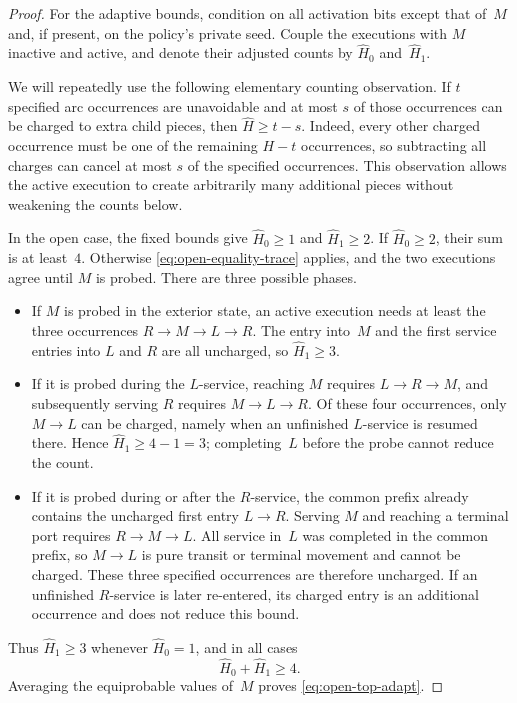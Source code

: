 \documentclass[12pt,a4paper,oneside]{report}
\begin{document}
\begin{proof}
For the adaptive bounds, condition on all activation bits except that of~$M$
and, if present, on the policy's private seed.  Couple the executions with
$M$ inactive and active, and denote their adjusted counts by
$\widehat H_0$ and~$\widehat H_1$.

We will repeatedly use the following elementary counting observation.  If
$t$ specified arc occurrences are unavoidable and at most $s$ of those
occurrences can be charged to extra child pieces, then
$\widehat H\ge t-s$.  Indeed, every other charged occurrence must be one of
the remaining $H-t$ occurrences, so subtracting all charges can cancel at
most $s$ of the specified occurrences.  This observation allows the active
execution to create arbitrarily many additional pieces without weakening the
counts below.

In the open case, the fixed bounds give $\widehat H_0\ge1$ and
$\widehat H_1\ge2$.  If $\widehat H_0\ge2$, their sum is at least~$4$.
Otherwise \cref{eq:open-equality-trace} applies, and the two executions agree
until $M$ is probed.  There are three possible phases.
\begin{itemize}
    \item If $M$ is probed in the exterior state, an active execution needs at
    least the three occurrences $R\to M\to L\to R$.  The entry into~$M$ and
    the first service entries into $L$ and $R$ are all uncharged, so
    $\widehat H_1\ge3$.
    \item If it is probed during the $L$-service, reaching $M$ requires
    $L\to R\to M$, and subsequently serving $R$ requires
    $M\to L\to R$.  Of these four occurrences, only $M\to L$ can be charged,
    namely when an unfinished $L$-service is resumed there.  Hence
    $\widehat H_1\ge4-1=3$; completing~$L$ before the probe cannot reduce the
    count.
    \item If it is probed during or after the $R$-service, the common prefix
    already contains the uncharged first entry $L\to R$.  Serving $M$ and
    reaching a terminal port requires $R\to M\to L$.  All service in~$L$ was
    completed in the common prefix, so $M\to L$ is pure transit or terminal
    movement and cannot be charged.  These three specified occurrences are
    therefore uncharged.  If an unfinished $R$-service is later re-entered,
    its charged entry is an additional occurrence and does not reduce this
    bound.
\end{itemize}
Thus $\widehat H_1\ge3$ whenever $\widehat H_0=1$, and in all cases
\[
    \widehat H_0+\widehat H_1\ge4.
\]
Averaging the equiprobable values of~$M$ proves
\cref{eq:open-top-adapt}.


\end{proof}
\end{document}
